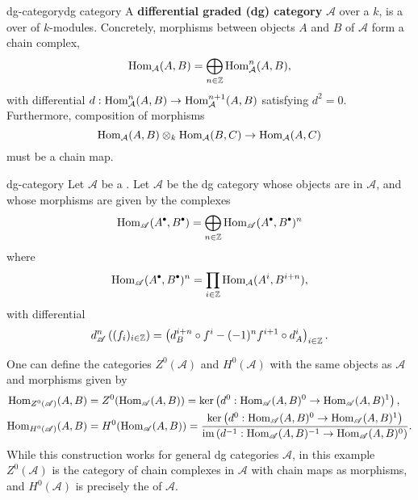 \begin{topic}{dg-category}{dg category}
    A \textbf{differential graded (dg) category} $\mathcal{A}$ over a  $k$, is a   over  of $k$-modules. Concretely, morphisms between objects $A$ and $B$ of $\mathcal{A}$ form a chain complex,
    \[ \text{Hom}_\mathcal{A}(A, B) = \bigoplus_{n \in \mathbb{Z}} \text{Hom}^n_\mathcal{A}(A, B) , \]
    with differential $d : \text{Hom}^n_\mathcal{A}(A, B) \to \text{Hom}^{n + 1}_\mathcal{A}(A, B)$ satisfying $d^2 = 0$. Furthermore, composition of morphisms
    \[ \text{Hom}_\mathcal{A}(A, B) \otimes_k \text{Hom}_\mathcal{A}(B, C) \to \text{Hom}_\mathcal{A}(A, C) \]
    must be a chain map.
\end{topic}

\begin{example}{dg-category}
    Let $\mathcal{A}$ be a . Let $\mathscr{A}$ be the dg category whose objects are  in $\mathcal{A}$, and whose morphisms are given by the complexes
    \[ \Hom_\mathscr{A}(A^\bdot, B^\bdot) = \bigoplus_{n \in \ZZ} \Hom_\mathscr{A}(A^\bdot, B^\bdot)^n \]
    where
    \[ \Hom_\mathscr{A}(A^\bdot, B^\bdot)^n = \prod_{i \in \ZZ} \Hom_\mathcal{A}(A^i, B^{i + n}) , \]
    with differential
    \[ d_\mathscr{A}^n \left( (f_i)_{i \in \mathbb{Z}} \right) = \left( d_B^{i + n} \circ f^i - (-1)^n f^{i + 1} \circ d_A^i \right)_{i \in \mathbb{Z}} . \]
    
    One can define the categories $Z^0(\mathscr{A})$ and $H^0(\mathscr{A})$ with the same objects as $\mathscr{A}$ and morphisms given by
    \[ \begin{aligned}
        \text{Hom}_{Z^0(\mathscr{A})}(A, B) &= Z^0(\text{Hom}_\mathscr{A}(A, B)) = \ker \left(d^0 : \text{Hom}_\mathscr{A}(A, B)^0 \to \text{Hom}_\mathscr{A}(A, B)^1 \right) , \\
        \text{Hom}_{H^0(\mathscr{A})}(A, B) &= H^0(\text{Hom}_\mathscr{A}(A, B)) = \frac{\ker \left(d^0 : \text{Hom}_\mathscr{A}(A, B)^0 \to \text{Hom}_\mathscr{A}(A, B)^1 \right)}{\operatorname{im} \left(d^{-1} : \text{Hom}_\mathscr{A}(A, B)^{-1} \to \text{Hom}_\mathscr{A}(A, B)^{0} \right)} .
    \end{aligned} \]
    While this construction works for general dg categories $\mathscr{A}$, in this example $Z^0(\mathscr{A})$ is the category of chain complexes in $\mathcal{A}$ with chain maps as morphisms, and $H^0(\mathscr{A})$ is precisely the  of $\mathcal{A}$.
\end{example}

